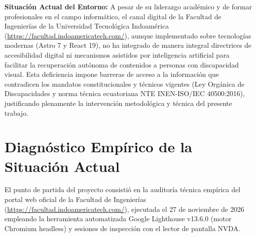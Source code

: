 \textbf{Situación Actual del Entorno:} A pesar de su liderazgo académico y de formar profesionales en el campo informático, el canal digital de la Facultad de Ingenierías de la Universidad Tecnológica Indoamérica (\url{https://facultad.indoamericatech.com/}), aunque implementado sobre tecnologías modernas (Astro 7 y React 19), no ha integrado de manera integral directrices de accesibilidad digital ni mecanismos asistidos por inteligencia artificial para facilitar la recuperación autónoma de contenidos a personas con discapacidad visual. Esta deficiencia impone barreras de acceso a la información que contradicen los mandatos constitucionales y técnicos vigentes (Ley Orgánica de Discapacidades y norma técnica ecuatoriana NTE INEN-ISO/IEC 40500:2016), justificando plenamente la intervención metodológica y técnica del presente trabajo.

\section{Diagnóstico Empírico de la Situación Actual}
El punto de partida del proyecto consistió en la auditoría técnica empírica del portal web oficial de la Facultad de Ingenierías (\url{https://facultad.indoamericatech.com/}), ejecutada el 27 de noviembre de 2026 empleando la herramienta automatizada Google Lighthouse v13.6.0 (motor Chromium headless) y sesiones de inspección con el lector de pantalla NVDA.


